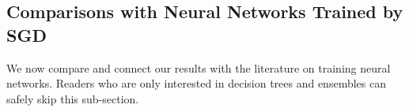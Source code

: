 \documentclass[11pt]{article}
\newcommand{\kb}[1]{{\color{purple}[KB: #1]}}
\newcommand{\comment}[2]{{#2}}
\begin{document}




\subsection{Comparisons with Neural Networks Trained by SGD}
\label{subsec:comparisons_with_NNs}
\comment{red}{We now compare and connect our results with the literature on training neural networks. 
Readers who are only interested in decision trees and ensembles can safely skip this sub-section.}
\end{document}
